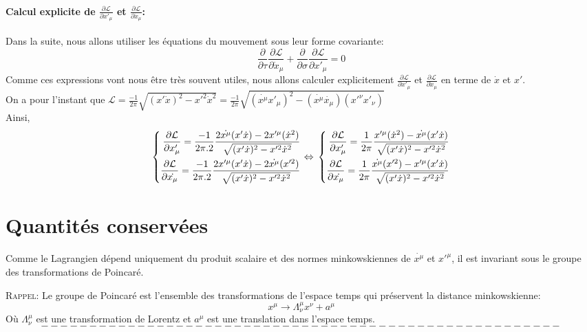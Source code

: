 \documentclass[a4paper,12pt]{article}
\def\xmu{x^\mu}
\def\CL{\mathcal{L}}
\begin{document}
\paragraph*{Calcul explicite de $\frac{\partial \CL}{\partial x'_{\mu}}$ et $\frac{\partial \CL}{\partial \dot x_{\mu}}$:}
Dans la suite, nous allons utiliser les équations du mouvement sous leur forme covariante:
$$\frac{\partial}{\partial \tau}\frac{\partial \CL}{\partial \dot x_{\mu}}+\frac{\partial}{\partial \sigma}\frac{\partial \CL}{\partial  x'_{\mu}}=0$$
Comme ces expressions vont nous être très souvent utiles, nous allons calculer explicitement $\frac{\partial \CL}{\partial x'_{\mu}}$ et $\frac{\partial \CL}{\partial \dot x_{\mu}}$ en terme de $\dot{x}$ et $x'$.\\
On a pour l'instant que $\CL=\frac{-1}{2\pi}\sqrt{(x'\dot{x})^2-x'^2\dot{x}^2}=\frac{-1}{2\pi}\sqrt{(\dot{\xmu}x'_\mu)^2-(\dot{\xmu}\dot{x_\mu})(x'^\nu x'_\nu)}$\\
Ainsi,
\begin{equation}
	\left\lbrace 
	\begin{aligned}
	\frac{\partial \CL}{\partial x'_\mu }=\frac{-1}{2\pi.2}\frac{2\dot{\xmu}(x'\dot{x})-2x'^\mu (\dot{x}^2)}{\sqrt{(x'\dot{x})^2-x'^2\dot{x}^2}}\\
	\frac{\partial \CL}{\partial \dot{x_\mu}}=\frac{-1}{2\pi.2}\frac{2x'^\mu(x'\dot{x})-2\dot{\xmu} (x'^2)}{\sqrt{(x'\dot{x})^2-x'^2\dot{x}^2}}\\
	\end{aligned} 
	\right. 
	\Leftrightarrow\\
	\left\lbrace
	\begin{aligned}
	\frac{\partial \CL}{\partial x'_\mu }=\frac{1}{2\pi}\frac{x'^\mu (\dot{x}^2)-\dot{\xmu}(x'\dot{x})}{\sqrt{(x'\dot{x})^2-x'^2\dot{x}^2}}\\
	\frac{\partial \CL}{\partial \dot{x_\mu}}=\frac{1}{2\pi}\frac{\dot{\xmu} (x'^2)-x'^\mu(x'\dot{x})}{\sqrt{(x'\dot{x})^2-x'^2\dot{x}^2}}\\
	\end{aligned}
	\right.
\end{equation}
\section{Quantités conservées}
Comme le Lagrangien dépend uniquement du produit scalaire et des normes minkowskiennes de $\dot{x^{\mu}}$ et $x'^{\mu}$, il est invariant sous le groupe des transformations de Poincaré.

\textsc{Rappel}: Le groupe de Poincaré est l'ensemble des transformations de l'espace temps qui préservent la distance minkowskienne:
$$ x^{\mu}\rightarrow\Lambda_{\nu}^{\mu}x^{\nu}+a^{\mu}$$ 
Où $\Lambda_{\nu}^{\mu}$ est une transformation de Lorentz et $a^{\mu}$ est une translation dans l'espace temps.\\
$$------------------------------------------------------$$
\end{document}
